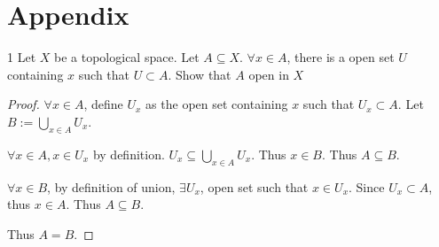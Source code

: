 \documentclass{article}
\begin{document}
\bigskip


\pagebreak

\section*{Appendix}
\begin{PROB}{1}\label{Problem 1.}
    Let $X$ be a topological space. Let $A \subseteq X$. $\forall x \in A$, there is a open set $U$ containing $x$ such that $U \subset A$. Show that $A$ open in $X$        
\end{PROB}
\begin{proof}
    $\forall x \in A$, define $U_x$ as the open set containing $x$ such that $U_x \subset A$. Let $B := \bigcup_{x \in A} U_x$. 
    
    $\forall x \in A, x \in U_x$ by definition. $U_x \subseteq \bigcup_{x \in A} U_x$. Thus $x \in B$. Thus $A \subseteq B$.
    
    $\forall x \in B$, by definition of union, $\exists U_x$, open set such that $x \in U_x$. Since $U_x \subset A$, thus $x \in A$. Thus $A \subseteq B$.
    
    Thus $A = B$. 
\end{proof}

\bigskip
\end{document}
